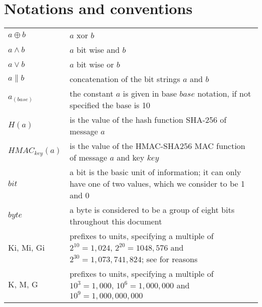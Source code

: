 \section{Notations and conventions}
\begin{tabular}{lp{10cm}}
$a \oplus b$ & $a$ xor $b$ \\
$a \wedge b$ & $a$ bit wise and $b$ \\
$a \vee b$ & $a$ bit wise or $b$ \\
$a \parallel b$ & concatenation of the bit strings $a$ and $b$ \\
$a_{(base)}$ & the constant $a$ is given in base $base$ notation, if not specified the base is 10\\
$H(a)$ & is the value of the hash function SHA-256 of message $a$ \\
$HMAC_{key}(a)$ & is the value of the HMAC-SHA256 MAC function of message $a$ and key $key$ \\
$bit$ & a bit is the basic unit of information; it can only have one of two values, which we consider to be 1 and 0 \\
$byte$ & a byte is considered to be a group of eight bits throughout this document \\
Ki, Mi, Gi & prefixes to units, specifying a multiple of $2^{10} = 1,024$, $2^{20} = 1048,576$ and $2^{30} = 1,073,741,824$; see \cite{IEC60027-2} for reasons \\
K, M, G & prefixes to units, specifying a multiple of $10^3 = 1,000$, $10^6 = 1,000,000$ and $10^9=1,000,000,000$ \\ 
\end{tabular}